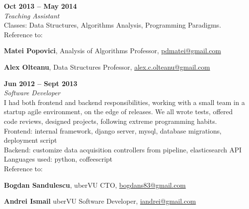 \documentclass[margin,line]{resume}
\begin{document}
\begin{resume}
		\hfill \textbf{Oct 2013 -- May 2014}\vspace{1mm}\\
	{\fontsize{4mm}{0em}\selectfont
		\textsl{Teaching Assistant}\vspace{1.5mm}\\
	}
	Classes: Data Structures, Algorithms Analysis, Programming Paradigms.\vspace{1.2mm}\\
	Reference to:
	\begin{list2}
		\item \textbf{Matei Popovici}, Analysis of Algorithms Professor, \href{mailto:pdmatei@gmail.com}{pdmatei@gmail.com}
		\item \textbf{Alex Olteanu}, Data Structures Professor, \href{mailto:alex.c.olteanu@gmail.com}{alex.c.olteanu@gmail.com}
	\end{list2}

		\hfill \textbf{Jun 2012 -- Sept 2013}\vspace{1.2mm}\\
	{\fontsize{4mm}{0em}\selectfont
		\textsl{Software Developer}\vspace{1.5mm}\\
	}
	I had both frontend and backend responsibilities, working with a small team in a startup agile environment, on the edge of releases. We all wrote tests, offered code reviews, designed projects, following extreme programming habits.\vspace{1.2mm}\\
	Frontend: internal framework, django server, mysql, database migrations, deployment script\vspace{1.2mm}\\
	Backend: customize data acquisition controllers from pipeline, elasticsearch API\vspace{1.2mm}\\
	Languages used: python, coffeescript\vspace{1.2mm}\\
	Reference to:
	\begin{list2}
		\item \textbf{Bogdan Sandulescu}, uberVU CTO, \href{mailto:bogdans83@gmail.com}{bogdans83@gmail.com}
		\item \textbf{Andrei Ismail} uberVU Software Developer, \href{mailto:iandrei@gmail.com}{iandrei@gmail.com}
	\end{list2}


\end{resume}
\end{document}
